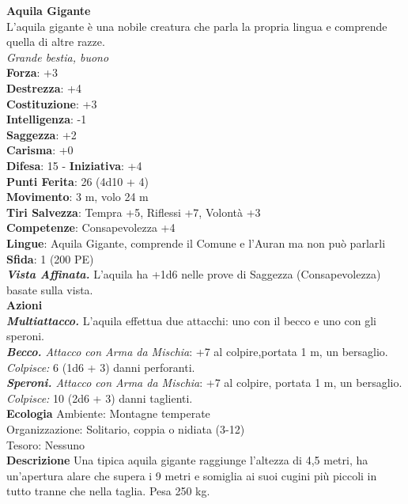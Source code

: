 \begin{multicols}{2}
\medskip\textbf{Aquila Gigante}\\
L'aquila gigante è una nobile creatura che parla la propria lingua e comprende quella di altre razze.\\
\emph{Grande bestia, buono}\\
\textbf{Forza}: +3\\
\textbf{Destrezza}: +4\\
\textbf{Costituzione}: +3\\
\textbf{Intelligenza}: -1\\
\textbf{Saggezza}: +2\\
\textbf{Carisma}: +0\\
\textbf{Difesa}: 15 - \textbf{Iniziativa}: +4\\
\textbf{Punti Ferita}: 26 (4d10 + 4)\\
\textbf{Movimento}: 3 m, volo 24 m\\
\textbf{Tiri Salvezza}: Tempra +5, Riflessi +7, Volontà +3\\
\textbf{Competenze}: Consapevolezza +4\\
\textbf{Lingue}: Aquila Gigante, comprende il Comune e l'Auran ma non può parlarli\\
\textbf{Sfida}: 1 (200 PE)\smallskip\\
\emph{\textbf{Vista Affinata.}} L'aquila ha +1d6 nelle prove di Saggezza (Consapevolezza) basate sulla vista.\\
\smallskip\textbf{Azioni}\\
\emph{\textbf{Multiattacco.}} L'aquila effettua due attacchi: uno con il becco e uno con gli speroni.\\
\emph{\textbf{Becco.} Attacco con Arma da Mischia}: +7 al colpire,portata 1 m, un bersaglio.\\
\emph{Colpisce:} 6 (1d6 + 3) danni perforanti.\\
\emph{\textbf{Speroni.} Attacco con Arma da Mischia}: +7 al colpire, portata 1 m, un bersaglio.\\
\emph{Colpisce:} 10 (2d6 + 3) danni taglienti.\\
\textbf{Ecologia}
Ambiente: Montagne temperate\\
Organizzazione: Solitario, coppia o nidiata (3-12)\\
Tesoro: Nessuno\\
\textbf{Descrizione}
Una tipica aquila gigante raggiunge l'altezza di 4,5 metri, ha un'apertura alare che supera i 9 metri e somiglia ai suoi cugini più piccoli in tutto tranne che nella taglia. Pesa 250 kg.\\


\end{multicols}
